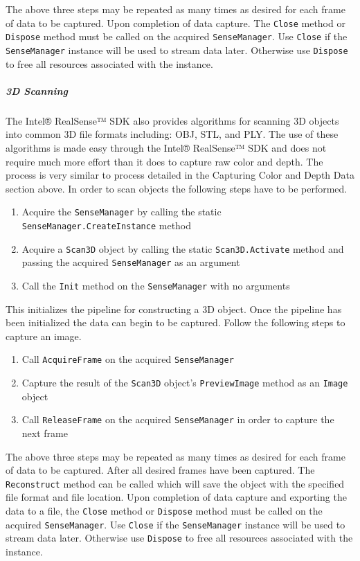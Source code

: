 \documentclass[12pt]{article}
\providecommand{\tightlist}{%
  \setlength{\itemsep}{0pt}\setlength{\parskip}{0pt}}
\begin{document}
The above three steps may be repeated as many times as desired for each
frame of data to be captured. Upon completion of data capture. The
\texttt{Close} method or \texttt{Dispose} method must be called on the
acquired \texttt{SenseManager}. Use \texttt{Close} if the
\texttt{SenseManager} instance will be used to stream data later.
Otherwise use \texttt{Dispose} to free all resources associated with the
instance.

\subparagraph{3D Scanning}\label{d-scanning}

The Intel® RealSense™ SDK also provides algorithms for scanning 3D
objects into common 3D file formats including: OBJ, STL, and PLY. The
use of these algorithms is made easy through the Intel® RealSense™ SDK
and does not require much more effort than it does to capture raw color
and depth. The process is very similar to process detailed in the
Capturing Color and Depth Data section above. In order to scan objects
the following steps have to be performed.

\begin{enumerate}
\def\labelenumi{\arabic{enumi}.}
\tightlist
\item
  Acquire the \texttt{SenseManager} by calling the static
  \texttt{SenseManager.CreateInstance} method
\item
  Acquire a \texttt{Scan3D} object by calling the static
  \texttt{Scan3D.Activate} method and passing the acquired
  \texttt{SenseManager} as an argument
\item
  Call the \texttt{Init} method on the \texttt{SenseManager} with no
  arguments
\end{enumerate}

This initializes the pipeline for constructing a 3D object. Once the
pipeline has been initialized the data can begin to be captured. Follow
the following steps to capture an image.

\begin{enumerate}
\def\labelenumi{\arabic{enumi}.}
\tightlist
\item
  Call \texttt{AcquireFrame} on the acquired \texttt{SenseManager}
\item
  Capture the result of the \texttt{Scan3D} object's
  \texttt{PreviewImage} method as an \texttt{Image} object
\item
  Call \texttt{ReleaseFrame} on the acquired \texttt{SenseManager} in
  order to capture the next frame
\end{enumerate}

The above three steps may be repeated as many times as desired for each
frame of data to be captured. After all desired frames have been
captured. The \texttt{Reconstruct} method can be called which will save
the object with the specified file format and file location. Upon
completion of data capture and exporting the data to a file, the
\texttt{Close} method or \texttt{Dispose} method must be called on the
acquired \texttt{SenseManager}. Use \texttt{Close} if the
\texttt{SenseManager} instance will be used to stream data later.
Otherwise use \texttt{Dispose} to free all resources associated with the
instance.
\end{document}
